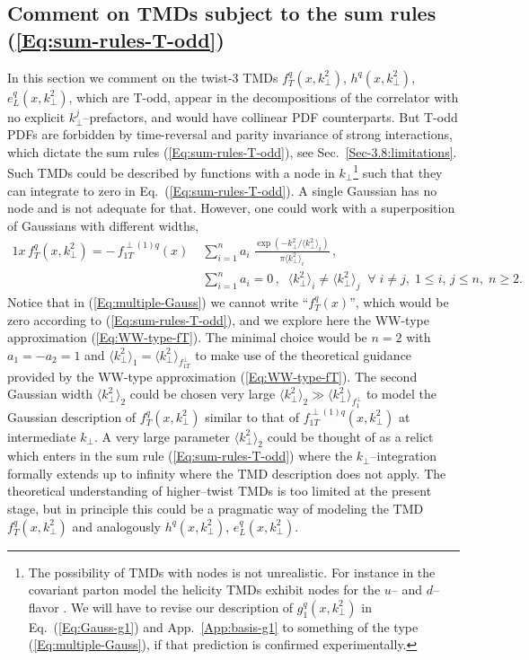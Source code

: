 \documentclass[a4paper,11pt]{article}
\newcommand{\la}{\langle}
\newcommand{\ra}{\rangle}
\def\kperp{k_\perp}
\begin{document}
\subsection{Comment on TMDs subject to the sum rules (\ref{Eq:sum-rules-T-odd})}
\label{App-B:comment-Todd-twist-3}

In this section we comment on the twist-3 TMDs
$f_T^q(x,\kperp^{2})$,  $h^q(x,\kperp^{2})$, $e_L^q(x,\kperp^{2})$,
which are T-odd, appear in the decompositions of the correlator with no
explicit $k_\perp^j$--prefactors, and would have collinear PDF counterparts.
But T-odd PDFs are forbidden by time-reversal and parity invariance of
strong interactions, which dictate the sum rules (\ref{Eq:sum-rules-T-odd}),
see Sec.~\ref{Sec-3.8:limitations}.
Such TMDs could be described by functions with a node in
$k_\perp$\footnote{The possibility of TMDs with nodes is not unrealistic.
	For instance in the covariant parton model the helicity TMDs
	exhibit nodes for the $u$-- and $d$--flavor \cite{Efremov:2010mt}.
	We will have to revise our description of $g_1^q(x,\kperp^{2})$
	in Eq.~(\ref{Eq:Gauss-g1}) and App.~\ref{App:basis-g1} to something
	of the type (\ref{Eq:multiple-Gauss}), if that prediction is
	confirmed experimentally. }
such that they can integrate to zero in Eq.~(\ref{Eq:sum-rules-T-odd}).
A single Gaussian has no node and is not adequate for that.
However, one could work with a superposition of Gaussians
with different widths,
\begin{alignat}{1}
	x \, f_T^q(x,\kperp^{2}) =  - \, f_{1T}^{\perp (1)q}(x)\;
	&\sum\limits_{i=1}^{n} a_i\;
	\frac{\exp(-\kperp^2/\la\kperp^2\ra_i^{ })}{\pi\la\kperp^2\ra_i^{ }}\,,
	\label{Eq:multiple-Gauss}\\
	&\sum\limits_{i=1}^n a_i = 0\,, \;\;
	\la\kperp^2\ra_i^{ }\neq\la\kperp^2\ra_j^{ }\;\;\forall\;i\neq j,
	\; 1\le i,\,j\le n,\;n\ge 2.\nonumber
\end{alignat}
Notice that in (\ref{Eq:multiple-Gauss}) we cannot write ``$f_T^q(x)$'',
which would be zero according to (\ref{Eq:sum-rules-T-odd}), and we
explore here the WW-type approximation (\ref{Eq:WW-type-fT}).
The minimal choice would be $n=2$ with $a_1=-a_2=1$ and
$\la\kperp^2\ra_1^{ } = \la\kperp^2\ra_{f_{1T}^\perp}$ to make use
of the theoretical guidance provided by the WW-type approximation
(\ref{Eq:WW-type-fT}).
The second Gaussian width $\la\kperp^2\ra_2^{ }$ could be chosen
very large $\la\kperp^2\ra_2^{ } \gg \la\kperp^2\ra_{f_1^\perp}$ to
model the Gaussian description of $f_T^{q}(x,\kperp^{2})$ similar to
that of $f_{1T}^{\perp(1)q}(x,\kperp^2)$ at intermediate $\kperp$.
A very large parameter $\la\kperp^2\ra_2^{ }$ could be thought of as
a relict which enters in the sum rule (\ref{Eq:sum-rules-T-odd})
where the $\kperp$--integration formally extends up to infinity
where the TMD description does not apply. The theoretical
understanding of higher--twist TMDs is too limited at
the present stage, but in principle this could be a
pragmatic way of modeling the TMD $f_T^q(x,\kperp^{2})$
and analogously $h^q(x,\kperp^{2})$, $e_L^q(x,\kperp^{2})$.
\end{document}
